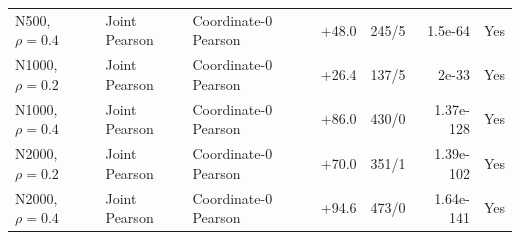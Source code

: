 \begin{table}[t]
{\begin{tabular}{lllrrrl}
N500, $\rho=0.4$ & Joint Pearson & Coordinate-0 Pearson & +48.0 & 245/5 & 1.5e-64 & Yes\\
N1000, $\rho=0.2$ & Joint Pearson & Coordinate-0 Pearson & +26.4 & 137/5 & 2e-33 & Yes\\
N1000, $\rho=0.4$ & Joint Pearson & Coordinate-0 Pearson & +86.0 & 430/0 & 1.37e-128 & Yes\\
N2000, $\rho=0.2$ & Joint Pearson & Coordinate-0 Pearson & +70.0 & 351/1 & 1.39e-102 & Yes\\
N2000, $\rho=0.4$ & Joint Pearson & Coordinate-0 Pearson & +94.6 & 473/0 & 1.64e-141 & Yes\\
\bottomrule
\end{tabular}}
\end{table}
